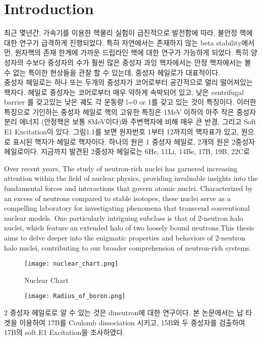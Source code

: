 \chapter{Introduction}
최근 몇년간, 가속기를 이용한 핵물리 실험이 급진적으로 발전함에 따라, 불안정 핵에 대한 연구가 급격하게 진행되었다. 특히 자연에서는 존재하지 않는 beta stability에서 먼, 원자핵의 존재 한계에 가까운 드립라인 핵에 대한 연구가 가능하게 되었다. 특히 양성자의 수보다 중성자의 수가 훨씬 많은 중성자 과잉 핵자에서는 안정 핵자에서는 볼 수 없는 특이한 현상들을 관찰 할 수 있는데, 중성자 헤일로가 대표적이다. \\
\indent 중성자 헤일로는 하나 또는 두개의 중성자가 코어로부터 공간적으로 멀리 떨어져있는 핵자다. 헤일로 중성자는 코어로부터 매우 약하게 속박되어 있고, 낮은 centrifugal barrier 를 갖고있는 낮은 궤도 각 운동량 l=0 or 1를 갖고 있는 것이 특징이다. 이러한 특징으로 기인하는 중성자 헤일로 핵의 고유한 특징은 1MeV 이하의 아주 작은 중성자 분리 에너지 (안정핵은 보통 8MeV이다)와 주변핵자에 비해 매우 큰 반경, 그리고 Soft E1 Excitation이 있다.
그림1.1를 보면 원자번호 1부터 12까지의 핵자표가 있고, 원으로 표시된 핵자가 헤일로 핵자이다. 하나의 원은 1 중성자 헤일로, 2개의 원은 2중성자 헤일로이다. 지금까지 발견된 2중성자 헤일로는 6He, 11Li, 14Be, 17B, 19B, 22C로 

Over recent years, The study of neutron-rich nuclei has garnered increasing attention within the field of nuclear physics, providing invaluable insights into the fundamental forces and interactions that govern atomic nuclei. Characterized by an excess of neutrons compared to stable isotopes, these nuclei serve as a compelling laboratory for investigating phenomena that transcend conventional nuclear models. One particularly intriguing subclass is that of 2-neutron halo nuclei, which feature an extended halo of two loosely bound neutrons.This thesis aims to delve deeper into the enigmatic properties and behaviors of 2-neutron halo nuclei, contributing to our broader comprehension of neutron-rich systems.

\begin{figure}
    \centering
    \texttt{[image: nuclear\_chart.png]}
    \caption{Nuclear Chart}
    \label{Nuclear chart}
\end{figure}
\begin{figure}
    \centering
    \texttt{[image: Radius\_of\_boron.png]}
\end{figure}
2 중성자 헤일로로 알 수 있는 것은 dineutron에 대한 연구이다. 
본 논문에서는 납 타겟을 이용하여 17B를 Coulomb dissociation 시키고, 15B와 두 중성자를 검출하여 17B의 soft E1 Excitation을 조사하였다.

